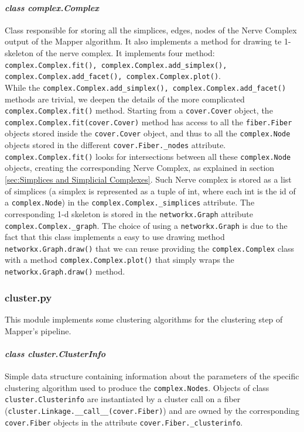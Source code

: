 \paragraph{\textit{class complex.Complex}}
Class responsible for storing all the simplices, edges, nodes of the Nerve Complex output of the Mapper algorithm. It also implements a method for drawing te 1-skeleton of the nerve complex. It implements four method: \lstinline|complex.Complex.fit(), complex.Complex.add_simplex(), complex.Complex.add_facet(), complex.Complex.plot()|.\\
While the \lstinline|complex.Complex.add_simplex(), complex.Complex.add_facet()| methods are trivial, we deepen the details of the more complicated \lstinline|complex.Complex.fit()| method. Starting from a \lstinline|cover.Cover| object, the \lstinline|complex.Complex.fit(cover.Cover)| method has access to all the \lstinline|fiber.Fiber| objects stored inside the \lstinline|cover.Cover| object, and thus to all the \lstinline|complex.Node| objects stored in the different \lstinline|cover.Fiber._nodes| attribute. \lstinline|complex.Complex.fit()| looks for intersections between all these \lstinline|complex.Node| objects, creating the corresponding Nerve Complex, as explained in section \ref{sec:Simplices and Simplicial Complexes}. Such Nerve complex is stored as a list of simplices (a simplex is represented as a tuple of int, where each int is the id of a \lstinline|complex.Node|) in the \lstinline|complex.Complex._simplices| attribute. The corresponding 1-d skeleton is stored in the \lstinline|networkx.Graph| attribute \lstinline|complex.Complex._graph|. The choice of using a \lstinline|networkx.Graph| is due to the fact that this class implements a easy to use drawing method \lstinline|networkx.Graph.draw()| that we can reuse providing the \lstinline|complex.Complex| class with a method \lstinline|complex.Complex.plot()| that simply wraps the \lstinline|networkx.Graph.draw()| method.

\subsubsection{cluster.py}
This module implements some clustering algorithms for the clustering step of Mapper's pipeline.
\paragraph{\textit{class cluster.ClusterInfo}}
Simple data structure containing information about the parameters of the specific clustering algorithm used to produce the \lstinline|complex.Nodes|. Objects of class \lstinline|cluster.Clusterinfo| are instantiated by a cluster call on a fiber (\lstinline|cluster.Linkage.__call__(cover.Fiber)|) and are owned by the corresponding \lstinline|cover.Fiber| objects in the attribute  \lstinline|cover.Fiber._clusterinfo|.
